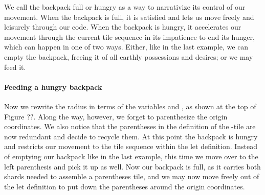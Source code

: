 We call the backpack full or hungry as a way
to narrativize its control of our movement.
When the backpack is full, it is satisfied
and lets us move freely and leisurely through
our code.
When the backpack is hungry, it accelerates our
movement through the current tile sequence
in its impatience to end its hunger, which can happen in one of two ways.
Either, like in the last example, we can empty the backpack,
freeing it of all earthly possessions and desires;
or we may feed it.




\paragraph{Feeding a hungry backpack}
Now we rewrite the radius in terms of the variables
 and , as shown at the top of
Figure ??.
Along the way, however, we forget to parenthesize
the origin coordinates.
We also notice that the parentheses in the definition
of the -tile are now redundant and decide
to recycle them.
At this point the backpack is hungry and restricts
our movement to the tile sequence within the
let definition.
Instead of emptying our backpack like in the
last example, this time we move over to the
left parenthesis and pick it up as well.
Now our backpack is full, as it carries both shards
needed to assemble a parentheses tile, and we may
now move freely out of the let definition
to put down the parentheses around the origin coordinates.


